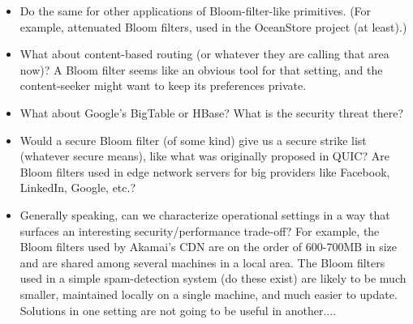 \begin{itemize}
\item Do the same for other applications of Bloom-filter-like primitives.  (For example, attenuated Bloom filters, used in the OceanStore project (at least).)

\item What about content-based routing (or whatever they are calling that area now)?  A Bloom filter seems like an obvious tool for that setting, and the content-seeker might want to keep its preferences private.

\item What about Google's BigTable or HBase?  What is the security threat there?

\item Would a secure Bloom filter (of some kind) give us a secure strike list (whatever secure means), like what was originally proposed in QUIC?  Are Bloom filters used in edge network servers for big providers like Facebook, LinkedIn, Google, etc.?

\item Generally speaking, can we characterize operational settings in a way that surfaces an interesting security/performance trade-off?  For example, the Bloom filters used by Akamai's CDN are on the order of 600-700MB in size and are shared among several machines in a local area.  The Bloom filters used in a simple spam-detection system (do these exist) are likely to be much smaller, maintained locally on a single machine, and much easier to update.  Solutions in one setting are not going to be useful in another....

\end{itemize}